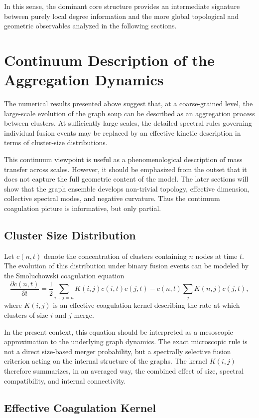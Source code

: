 \documentclass[11pt]{article}
\begin{document}
In this sense, the dominant core structure provides an intermediate signature between purely local degree information and the more global topological and geometric observables analyzed in the following sections.
\section{Continuum Description of the Aggregation Dynamics}

The numerical results presented above suggest that, at a coarse-grained level, the large-scale evolution of the graph soup can be described as an aggregation process between clusters.
At sufficiently large scales, the detailed spectral rules governing individual fusion events may be replaced by an effective kinetic description in terms of cluster-size distributions.

This continuum viewpoint is useful as a phenomenological description of mass transfer across scales.
However, it should be emphasized from the outset that it does not capture the full geometric content of the model.
The later sections will show that the graph ensemble develops non-trivial topology, effective dimension, collective spectral modes, and negative curvature.
Thus the continuum coagulation picture is informative, but only partial.

\subsection{Cluster Size Distribution}

Let $c(n,t)$ denote the concentration of clusters containing $n$ nodes at time $t$.
The evolution of this distribution under binary fusion events can be modeled by the Smoluchowski coagulation equation
\[
\frac{\partial c(n,t)}{\partial t}
=
\frac12
\sum_{i+j=n}
K(i,j)c(i,t)c(j,t)
-
c(n,t)\sum_j K(n,j)c(j,t),
\]
where $K(i,j)$ is an effective coagulation kernel describing the rate at which clusters of size $i$ and $j$ merge.

In the present context, this equation should be interpreted as a mesoscopic approximation to the underlying graph dynamics.
The exact microscopic rule is not a direct size-based merger probability, but a spectrally selective fusion criterion acting on the internal structure of the graphs.
The kernel $K(i,j)$ therefore summarizes, in an averaged way, the combined effect of size, spectral compatibility, and internal connectivity.

\subsection{Effective Coagulation Kernel}
\end{document}
